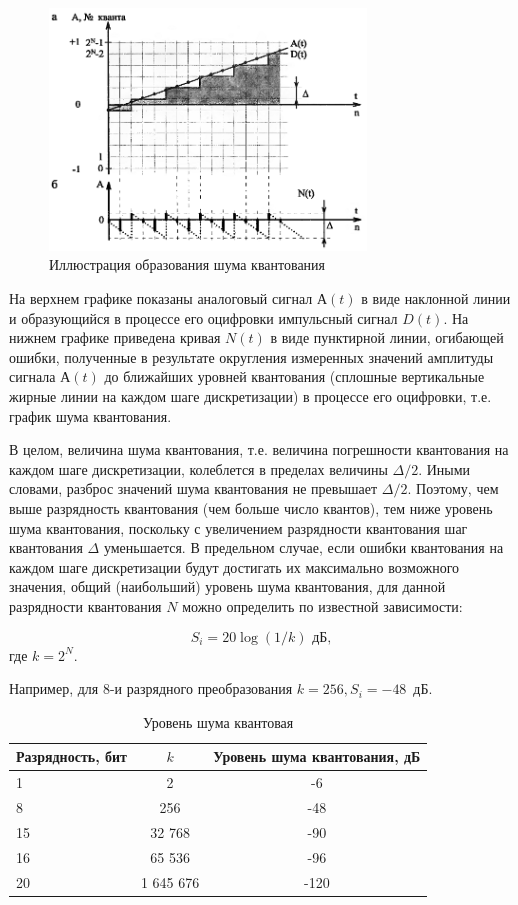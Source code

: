 \documentclass[oneside, final, 14pt]{extreport}
\begin{document}
\begin{figure}[h]
\centering
\includegraphics[width=0.75\textwidth]{pic-digital-09}
\caption{Иллюстрация образования шума квантования}
\label{pic-digital-09}
\end{figure}

На верхнем графике показаны аналоговый сигнал $А(t)$ в виде наклонной линии и образующийся в процессе его оцифровки импульсный сигнал $D(t)$. На нижнем графике приведена кривая $N(t)$ в виде пунктирной линии, огибающей ошибки, полученные в результате округления измеренных значений амплитуды сигнала $А(t)$ до ближайших уровней квантования (сплошные вертикальные жирные линии на каждом шаге дискретизации) в процессе его оцифровки, т.е. график шума квантования.

В целом, величина шума квантования, т.е. величина погрешности квантования на каждом шаге дискретизации, колеблется в пределах величины $\Delta/2$. Иными словами, разброс значений шума квантования не превышает $\Delta/2$. Поэтому, чем выше разрядность квантования (чем больше число квантов), тем ниже уровень шума квантования, поскольку с увеличением разрядности квантования шаг квантования
$\Delta$ уменьшается. В предельном случае, если ошибки квантования на каждом шаге дискретизации будут достигать их максимально возможного значения, общий (наибольший) уровень шума квантования, для данной разрядности квантования $N$ можно определить по известной зависимости:

\[S_i=20 \log(1/k)\text{~дБ,}\]
где $k=2^N$. 

Например, для 8-и разрядного преобразования $k=256, S_i=-48$~дБ.

\begin{table}[ht]
  \caption{Уровень шума квантовая}
  \begin{center}
  \begin{tabular}{|l|c|c|}
  \hline Разрядность, бит & $k$ & Уровень шума квантования, дБ\\
  \hline 1 & 2 & -6 \\  
  \hline 8 & 256 & -48 \\
  \hline 15 & 32 768 & -90 \\
  \hline 16 & 65 536 & -96 \\
  \hline 20 & 1 645 676 & -120 \\ 
  \hline
  \end{tabular}
  \end{center}  
  \label{table-digital-01}
\end{table}
\end{document}
